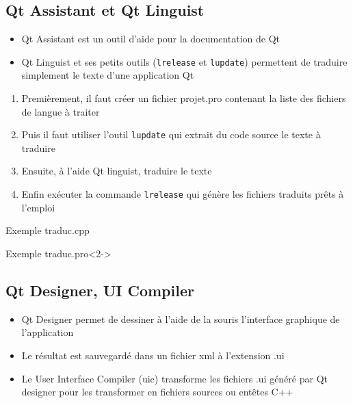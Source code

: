 \documentclass{beamer} %
\begin{document}
\subsection{Qt Assistant et Qt Linguist}
\begin{frame}
		{\centerline{}}

	\begin{itemize}
	\item Qt Assistant est un outil d'aide pour la documentation de Qt
	\item<2-> Qt Linguist et ses petits outils (\texttt{lrelease} et \texttt{lupdate}) permettent de traduire simplement le texte d'une application Qt
	\end{itemize}
\end{frame}


\begin{frame}
	\begin{enumerate}\itshape
	\item Premièrement, il faut créer un fichier projet.pro contenant la liste des fichiers de langue à traiter
	\item<2-> Puis il faut utiliser l'outil \texttt{lupdate} qui extrait du code source le texte à traduire
	\item<3-> Ensuite, à l'aide Qt linguist, traduire le texte
	\item<4-> Enfin exécuter la commande \texttt{lrelease} qui génère les fichiers traduits prêts à l'emploi
	\end{enumerate}
\end{frame}

\begin{frame}
\begin{exampleblock}{Exemple traduc.cpp}
	
\end{exampleblock}

\begin{exampleblock}{Exemple traduc.pro}<2->
	
\end{exampleblock}
\end{frame}

\subsection{Qt Designer, UI Compiler}
\begin{frame}
	\centerline{}

	\begin{itemize}
	\item Qt Designer permet de dessiner à l'aide de la souris l'interface graphique de l'application
	\item<2-> Le résultat est sauvegardé dans un fichier xml à l'extension .ui
	\item<3-> Le User Interface Compiler (uic) transforme les fichiers .ui généré par Qt designer pour les transformer en fichiers sources ou entêtes C++
	\end{itemize}
\end{frame}
\end{document}
